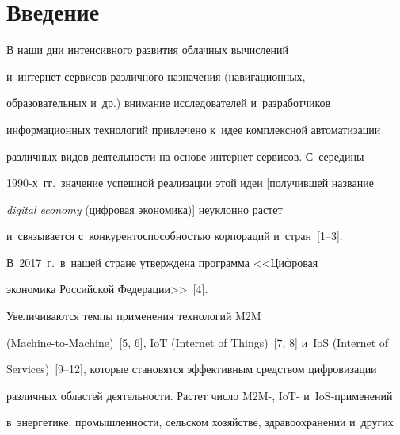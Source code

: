 




 \thispagestyle{headings}


 


 \vspace*{-16pt}





\section{Введение}





\vspace*{-2pt}





  В наши дни интенсивного развития облачных вычислений  


и~ин\-тер\-нет-сер\-ви\-сов различного назначения (навигационных, 


образовательных и~др.) внимание исследователей и~разработчиков 


информационных технологий привлечено к~идее комплексной автоматизации 


различных видов деятельности на основе ин\-тер\-нет-сер\-ви\-сов. С~середины 


1990-х~гг.\ значение успешной реализации этой идеи [получившей название 


\textit{digital economy} (цифровая экономика)] неуклонно рас\-тет 


и~связывается с~конкурентоспособностью корпораций и~стран~[1--3]. 


В~2017~г.\ в~нашей стране утверждена программа <<Цифровая 


экономика Российской Федерации>>~[4]. 


  


  Увеличиваются темпы применения технологий M2M  


(Machine-to-Machine)~[5, 6], IoT (Internet of Things)~[7, 8] и~IoS (Internet of 


Services)~[9--12], которые становятся эффективным средством циф\-ро\-ви\-за\-ции 


различных областей де\-я\-тель\-ности. Растет число M2M-, IoT- и~IoS-применений 


в~энергетике, промышленности, сельском хозяйстве, здравоохранении и~других 


